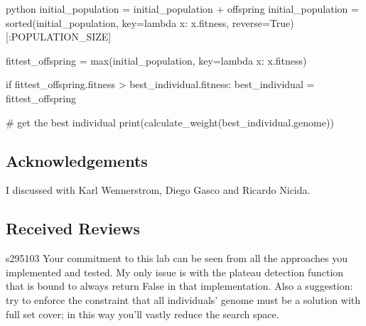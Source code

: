 \begin{mintedbox}{python}
        initial_population = initial_population + offspring
        initial_population = sorted(initial_population, key=lambda x: x.fitness, reverse=True)[:POPULATION_SIZE]

        fittest_offspring = max(initial_population, key=lambda x: x.fitness)

        if fittest_offspring.fitness > best_individual.fitness:
            best_individual = fittest_offspring

    # get the best individual
    print(calculate_weight(best_individual.genome))
\end{mintedbox}

\subsection{Acknowledgements}

I discussed with Karl Wennerstrom, Diego Gasco and Ricardo Nicida.

\subsection{Received Reviews}

\begin{tcolorbox}[colback=green!5!white,colframe=green!75!black,code={\singlespacing}]
    s295103
    \tcblower
    Your commitment to this lab can be seen from all the approaches you implemented and tested.
    My only issue is with the plateau detection function that is bound to always return False in that implementation.
    Also a suggestion: try to enforce the constraint that all individuals' genome must be a solution with full set cover; in this way you'll vastly reduce the search space.
\end{tcolorbox}

